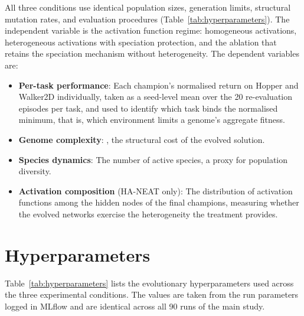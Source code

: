 All three conditions use identical population sizes, generation limits, structural mutation rates, and evaluation procedures (Table~\ref{tab:hyperparameters}).
The independent variable is the activation function regime: homogeneous activations, heterogeneous activations with speciation protection, and the ablation that retains the speciation mechanism without heterogeneity.
The dependent variables are:

\begin{itemize}
    \item \textbf{Per-task performance}: Each champion's normalised return on Hopper and Walker2D individually, taken as a seed-level mean over the 20 re-evaluation episodes per task, and used to identify which task binds the normalised minimum, that is, which environment limits a genome's aggregate fitness.
    \item \textbf{Genome complexity}: , the structural cost of the evolved solution.
    \item \textbf{Species dynamics}: The number of active species, a proxy for population diversity.
    \item \textbf{Activation composition} (HA-NEAT only): The distribution of activation functions among the hidden nodes of the final champions, measuring whether the evolved networks exercise the heterogeneity the treatment provides.
\end{itemize}

\section{Hyperparameters}
\label{subsec:hyperparameters}

Table~\ref{tab:hyperparameters} lists the evolutionary hyperparameters used across the three experimental conditions.
The values are taken from the run parameters logged in MLflow and are identical across all 90 runs of the main study.

